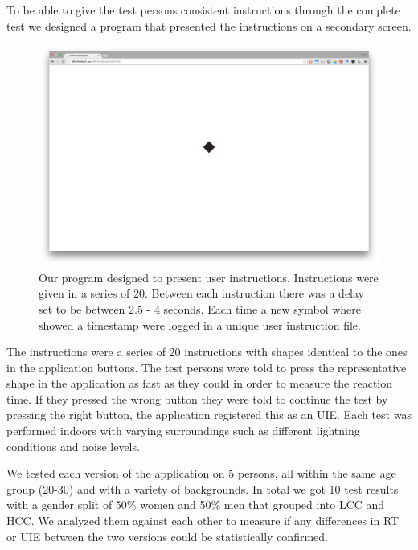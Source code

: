 \documentclass[runningheads,a4paper]{llncs}
\begin{document}
To be able to give the test persons consistent instructions through the complete test we designed a program that presented the instructions on a secondary screen. 
\begin{figure}
	\centering
	\includegraphics[width=\textwidth]{instructions}
	\caption{Our program designed to present user instructions. Instructions were given in a series of 20. Between each instruction there was a delay set to be between 2.5 - 4 seconds. Each time a new symbol where showed a timestamp were logged in a unique user instruction file.
	\label{fig:instructions}}
\end{figure}
The instructions were a series of 20 instructions with shapes identical to the ones in the application buttons. The test persons were told to press the representative shape in the application as fast as they could in order to measure the reaction time. If they pressed the wrong button they were told to continue the test by pressing the right button, the application registered this as an UIE. Each test was performed indoors with varying surroundings such as different lightning conditions and noise levels. 

We tested each version of the application on 5 persons, all within the same age group (20-30) and with a variety of backgrounds. In total we got 10 test results with a gender split of 50\% women and 50\% men that grouped into LCC and HCC. We analyzed them against each other to measure if any differences in RT or UIE between the two versions could be statistically confirmed.
\end{document}
